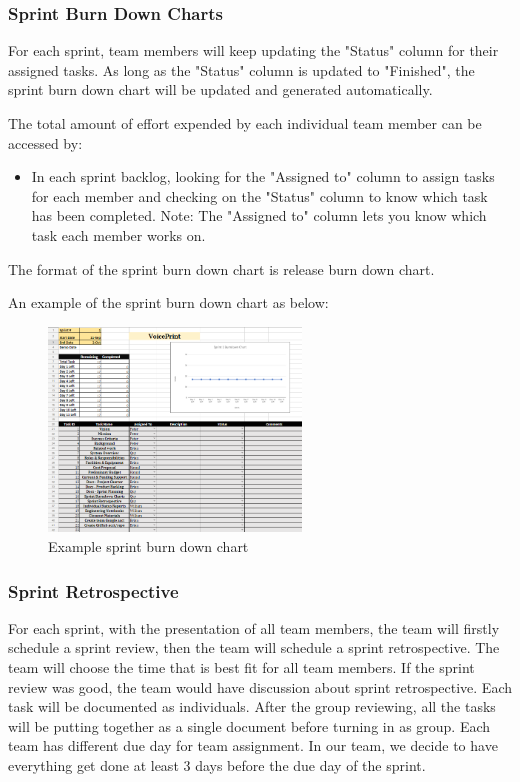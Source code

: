 \subsubsection{Sprint Burn Down Charts}
For each sprint, team members will keep updating the "Status" column for their assigned tasks. As long as the "Status" column is updated to "Finished", the sprint burn down chart will be updated and generated automatically. 

The total amount of effort expended by each individual team member can be accessed by:

\begin{itemize}
    
\item In each sprint backlog, looking for the "Assigned to" column to assign tasks for each member and checking on the "Status" column to know which task has been completed. 
Note: The "Assigned to" column lets you know which task each member works on.

\end{itemize}

The format of the sprint burn down chart is release burn down chart.

An example of the sprint burn down chart as below:

\begin{figure}[h!]
	\centering
   	\includegraphics[width=0.6\textwidth]{images/Chart.png}
    \caption{Example sprint burn down chart}
\end{figure}

\newpage\subsubsection{Sprint Retrospective}
For each sprint, with the presentation of all team members, the team will firstly schedule a sprint review, then the team will schedule a sprint retrospective. The team will choose the time that is best fit for all team members. If the sprint review was good, the team would have discussion about sprint retrospective. Each task will be documented as individuals. After the group reviewing, all the tasks will be putting together as a single document before turning in as group. Each team has different due day for team assignment. In our team, we decide to have everything get done at least 3 days before the due day of the sprint.


